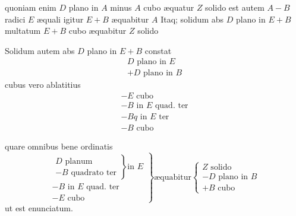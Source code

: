 \documentclass[11pt,a4paper]{article}
\begin{document}
quoniam enim $D$ plano in $A$ minus $A$ cubo æquatur $Z$ solido est autem $A - B$ radici $E$ æquali igitur $E + B$ æquabitur $A$ Itaq; solidum abs $D$ plano in $E + B$ multatum $E + B$ cubo æquabitur $Z$ solido

Solidum autem abs $D$ plano in $E + B$ constat
\[ \begin{array}{l} D \text{ plano in } E \\ + D \text{ plano in } B \end{array} \]
cubus vero ablatitius
\[ \begin{array}{l} - E \text{ cubo} \\ - B \text{ in } E \text{ quad. ter} \\ - B q \text{ in } E \text{ ter} \\ - B \text{ cubo} \end{array} \]

quare omnibus bene ordinatis
\[ \left.\begin{array}{l} \left.\begin{array}{l} D \text{ planum} \\ - B \text{ quadrato ter} \end{array}\right\} \text{in } E \\ - B \text{ in } E \text{ quad. ter} \\ - E \text{ cubo} \end{array}\right\} \text{æquabitur} \left\{\begin{array}{l} Z \text{ solido} \\ - D \text{ plano in } B \\ + B \text{ cubo} \end{array}\right. \]
ut est enunciatum.
\end{document}
